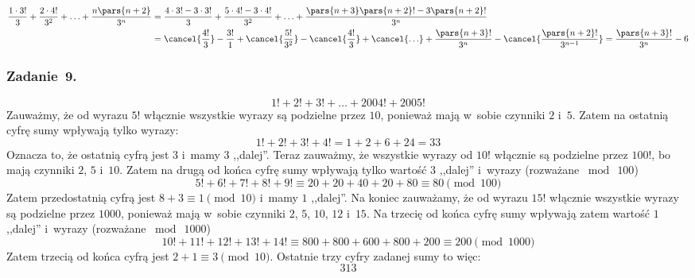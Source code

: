 \begin{enumerate}[label={\alph*)}]
        \begin{equation*}
            \begin{split}
                \frac{1 \cdot 3!}{3} + \frac{2 \cdot 4!}{3^2} + \ldots + \frac{n\pars{n + 2}}{3^n}
                    &= \frac{4 \cdot 3! - 3 \cdot 3!}{3} + \frac{5 \cdot 4! - 3 \cdot 4!}{3^2} + \ldots + \frac{\pars{n + 3}\pars{n + 2}! - 3\pars{n + 2}!}{3^n}\\
                    &= \cancel{\frac{4!}{3}} - \frac{3!}{1} + \cancel{\frac{5!}{3^2}} - \cancel{\frac{4!}{3}} + \cancel{\ldots} + \frac{\pars{n + 3}!}{3^n} - \cancel{\frac{\pars{n + 2}!}{3^{n - 1}}}
                    = \frac{\pars{n + 3}!}{3^n} - 6
            \end{split}
        \end{equation*}
\end{enumerate}
\subsubsection*{Zadanie~9.}
\begin{equation*}
    1! + 2! + 3! + \ldots + 2004! + 2005!
\end{equation*}
Zauważmy, że od wyrazu \(5!\) włącznie wszystkie wyrazy są podzielne przez \(10\), ponieważ mają w~sobie czynniki \(2\) i~\(5\). Zatem na ostatnią cyfrę sumy wpływają tylko wyrazy:
\begin{equation*}
    1! + 2! + 3! + 4!
        = 1 + 2 + 6 + 24
        = 33
\end{equation*}
Oznacza to, że ostatnią cyfrą jest \(3\) i~mamy \(3\) ,,dalej''. Teraz zauważmy, że wszystkie wyrazy od \(10!\) włącznie są podzielne przez \(100!\), bo mają czynniki \(2\), \(5\) i~\(10\). Zatem na drugą od końca cyfrę sumy wpływają tylko wartość \(3\) ,,dalej'' i~wyrazy (rozważane \(\bmod\ 100\))
\begin{equation*}
    5! + 6! + 7! + 8! + 9!
        \equiv 20 + 20 + 40 + 20 + 80
        \equiv 80 \pmod{100}
\end{equation*}
Zatem przedostatnią cyfrą jest \(8 + 3 \equiv 1 \pmod{10}\) i~mamy \(1\) ,,dalej''. Na koniec zauważamy, że od wyrazu \(15!\) włącznie wszystkie wyrazy są podzielne przez \(1000\), ponieważ mają w~sobie czynniki \(2\), \(5\), \(10\), \(12\) i~\(15\). Na trzecię od końca cyfrę sumy wpływają zatem wartość \(1\) ,,dalej'' i~wyrazy (rozważane \(\bmod\ 1000\))
\begin{equation*}
    10! + 11! + 12! + 13! + 14!
        \equiv 800 + 800 + 600 + 800 + 200
        \equiv 200 \pmod{1000}
\end{equation*}
Zatem trzecią od końca cyfrą jest \(2 + 1 \equiv 3 \pmod{10}\). Ostatnie trzy cyfry zadanej sumy to więc:
\begin{equation*}
    313
\end{equation*}
